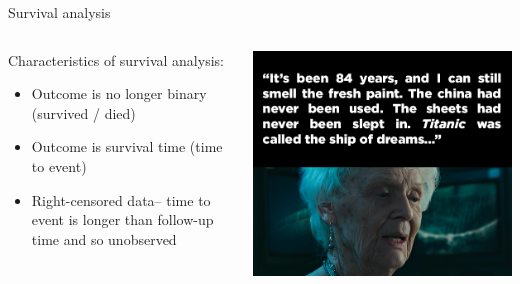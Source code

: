\documentclass[ignorenonframetext,]{beamer}
\begin{document}
\begin{frame}{Survival analysis}

\begin{columns}
\begin{column}{0.5\textwidth}
Characteristics of survival analysis:
\begin{itemize}
  \item Outcome is no longer binary (survived / died)
  \item Outcome is survival time (time to event)
  \item Right-censored data-- time to event is longer than follow-up time and so unobserved
\end{itemize}
\end{column}

\begin{column}{0.5\textwidth}
\includegraphics{images/survival_analysis.png}
\end{column}
\end{columns}

\end{frame}
\end{document}
